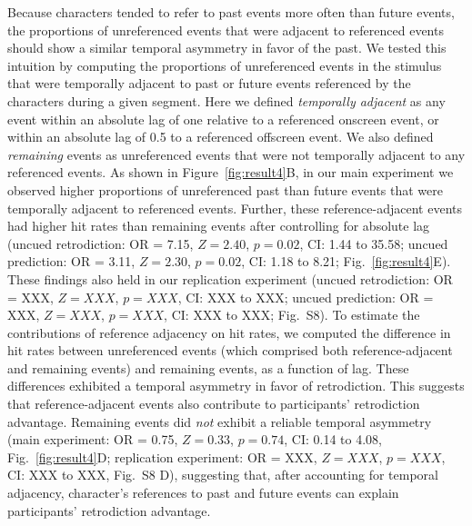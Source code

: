 \documentclass[10pt]{article}
\newcommand{\refAdjacent}{S8}
\begin{document}
Because characters tended to refer to past events more often than future
events, the proportions of unreferenced events that were adjacent to referenced
events should show a similar temporal asymmetry in favor of the past. We tested
this intuition by computing the proportions of unreferenced events in the
stimulus that were temporally adjacent to past or future events referenced by
the characters during a given segment. Here we defined \textit{temporally
adjacent} as any event within an absolute lag of one relative to a referenced
onscreen event, or within an absolute lag of 0.5 to a referenced offscreen
event. We also defined \textit{remaining} events as unreferenced events that
were not temporally adjacent to any referenced events. As shown in
Figure~\ref{fig:result4}B, in our main experiment we observed higher
proportions of unreferenced past than future events that were temporally
adjacent to referenced events. Further, these reference-adjacent events had
higher hit rates than remaining events after controlling for absolute lag
(uncued retrodiction: OR = 7.15, $Z = 2.40$, $p = 0.02$, CI: 1.44 to 35.58;
uncued prediction: OR = 3.11, $Z = 2.30$, $p = 0.02$, CI: 1.18 to 8.21;
Fig.~\ref{fig:result4}E). These findings also held in our replication
experiment (uncued retrodiction: OR = XXX, $Z = XXX$, $p = XXX$, CI: XXX to
XXX; uncued prediction: OR = XXX, $Z = XXX$, $p = XXX$, CI: XXX to XXX;
Fig.~\refAdjacent). To estimate the contributions of reference adjacency on hit
rates, we computed the difference in hit rates between unreferenced events
(which comprised both reference-adjacent and remaining events) and remaining
events, as a function of lag. These differences exhibited a temporal asymmetry
in favor of retrodiction. This suggests that reference-adjacent events also
contribute to participants' retrodiction advantage. Remaining events did
\textit{not} exhibit a reliable temporal asymmetry (main experiment: OR = 0.75,
$Z = 0.33$, $p = 0.74$, CI: 0.14 to 4.08, Fig.~\ref{fig:result4}D; replication
experiment: OR = XXX, $Z = XXX$, $p = XXX$, CI: XXX to XXX, Fig.~\refAdjacent
D), suggesting that, after accounting for temporal adjacency, character's
references to past and future events can explain participants' retrodiction
advantage.
\end{document}
